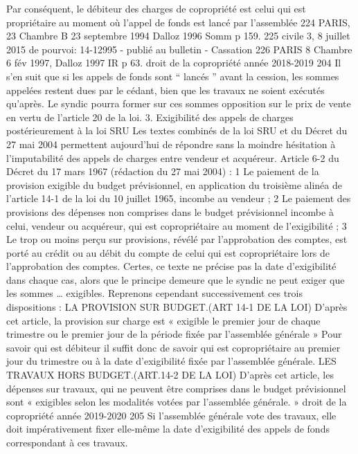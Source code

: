 	Par conséquent, le débiteur des charges de copropriété est celui qui est propriétaire au moment où l'appel
	de fonds est lancé par l'assemblée
	224 PARIS, 23\ieme{} Chambre B 23 septembre 1994 Dalloz 1996 Somm p 159.
	225 civile 3\ieme{}, 8 juillet 2015 \no de pourvoi: 14-12995 - publié au bulletin - Cassation
	226 PARIS 8\ieme{} Chambre 6 fév 1997, Dalloz 1997 IR p 63.
	droit de la copropriété année 2018-2019
	204
	Il s'en suit que si les appels de fonds sont “ lancés ” avant la cession, les sommes appelées restent dues
	par le cédant, bien que les travaux ne soient exécutés qu'après. Le syndic pourra former sur ces sommes
	opposition sur le prix de vente en vertu de l'article 20 de la loi.
	3. Exigibilité des appels de charges postérieurement à la loi SRU
	Les textes combinés de la loi SRU et du Décret du 27 mai 2004 permettent aujourd’hui de répondre sans
	la moindre hésitation à l’imputabilité des appels de charges entre vendeur et acquéreur.
	Article 6-2 du Décret du 17 mars 1967 (rédaction du 27 mai 2004) :
	1\degre{} Le paiement de la provision exigible du budget prévisionnel, en application du troisième alinéa de l'article
	14-1 de la loi du 10 juillet 1965, incombe au vendeur ;
	2\degre{} Le paiement des provisions des dépenses non comprises dans le budget prévisionnel incombe à celui,
	vendeur ou acquéreur, qui est copropriétaire au moment de l'exigibilité ;
	3\degre{} Le trop ou moins perçu sur provisions, révélé par l'approbation des comptes, est porté au crédit ou au
	débit du compte de celui qui est copropriétaire lors de l'approbation des comptes.
	Certes, ce texte ne précise pas la date d’exigibilité dans chaque cas, alors que le principe demeure que le
	syndic ne peut exiger que les sommes … exigibles. Reprenons cependant successivement ces trois
	dispositions :
	LA PROVISION SUR BUDGET.(ART 14-1 DE LA LOI)
	D’après cet article, la provision sur charge est « exigible le premier jour de chaque trimestre ou le premier
	jour de la période fixée par l'assemblée générale »
	Pour savoir qui est débiteur il suffit donc de savoir qui est copropriétaire au premier jour du trimestre ou
	à la date d’exigibilité fixée par l'assemblée générale.
	LES TRAVAUX HORS BUDGET.(ART.14-2 DE LA LOI)
	D’après cet article, les dépenses sur travaux, qui ne peuvent être comprises dans le budget prévisionnel
	sont « exigibles selon les modalités votées par l'assemblée générale. »
	droit de la copropriété année 2019-2020
	205
	Si l’assemblée générale vote des travaux, elle doit impérativement fixer elle-même la date d’exigibilité
	des appels de fonds correspondant à ces travaux.
